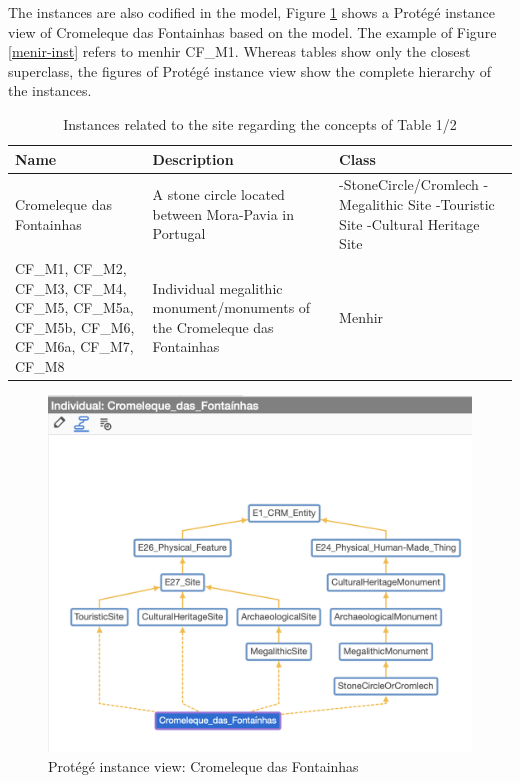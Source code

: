 \documentclass[10pt]{report}
\begin{document}
The instances are also codified in the model, Figure \ref{fontainhas-inst} shows a Protégé instance view of Cromeleque das Fontainhas based on the model. The example of Figure \ref{menir-inst} refers to menhir CF\_M1. Whereas tables show only the closest superclass, the figures of Protégé instance view show the complete hierarchy of the instances.


\begin{longtable}{|p{1.5in}|p{2in}|p{2in}|}
    \caption{Instances related to the site regarding the concepts of Table 1/2}
    \label{tab-inst-site} \\
    \hline
    Name & Description & Class \\
    \hline \hline
    Cromeleque das Fontainhas & A stone circle located between Mora-Pavia in Portugal & -StoneCircle/Cromlech \newline - Megalithic Site \newline -Touristic Site \newline -Cultural Heritage Site \\
    \hline
    CF\_M1, CF\_M2, CF\_M3, CF\_M4, CF\_M5, CF\_M5a, CF\_M5b, CF\_M6, CF\_M6a, CF\_M7, CF\_M8 & Individual megalithic monument/monuments of the Cromeleque das Fontainhas & Menhir \\ %
    \hline
\end{longtable}



\begin{figure}[!ht]
\centering
\includegraphics[width=0.8\linewidth]{figures/fontainhas-instance.png}
\caption{\label{fontainhas-inst} Protégé instance view: Cromeleque das Fontainhas}
\end{figure}
\end{document}
